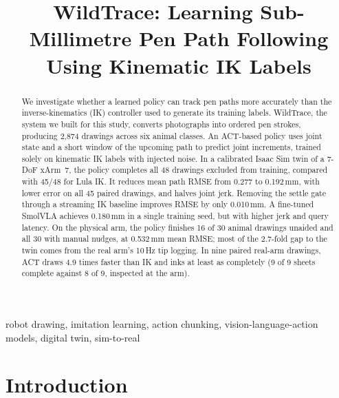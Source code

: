 \documentclass[conference]{IEEEtran}
\newcommand{\mm}{\,mm\xspace}
\begin{document}
\title{WildTrace: Learning Sub-Millimetre Pen Path Following Using Kinematic IK Labels}

\author{
}

\maketitle

\begin{abstract}
We investigate whether a learned policy can track pen paths more accurately than the inverse-kinematics (IK)
controller used to generate its training labels. WildTrace, the system we built for this study, converts
photographs into ordered pen strokes, producing 2,874 drawings across six animal classes. An ACT-based policy
uses joint state and a short window of the upcoming path to predict joint increments, trained solely on
kinematic IK labels with injected noise. In a calibrated Isaac Sim twin of a 7-DoF xArm~7, the policy completes
all 48 drawings excluded from training, compared with 45/48 for Lula IK. It reduces mean path RMSE from 0.277 to
0.192\mm, with lower error on all 45 paired drawings, and halves joint jerk. Removing the settle gate through a
streaming IK baseline improves RMSE by only 0.010\mm. A fine-tuned SmolVLA achieves 0.180\mm in a single
training seed, but with higher jerk and query latency. On the physical arm, the policy finishes 16 of 30 animal
drawings unaided and all 30 with manual nudges, at 0.532\mm mean RMSE; most of the 2.7-fold gap to the twin
comes from the real arm's 10\,Hz tip logging. In nine paired real-arm drawings, ACT draws 4.9 times faster than
IK and inks at least as completely (9 of 9 sheets complete against 8 of 9, inspected at the arm).
\end{abstract}

\begin{IEEEkeywords}
robot drawing, imitation learning, action chunking, vision-language-action models, digital twin, sim-to-real
\end{IEEEkeywords}

\section{Introduction}
\end{document}
